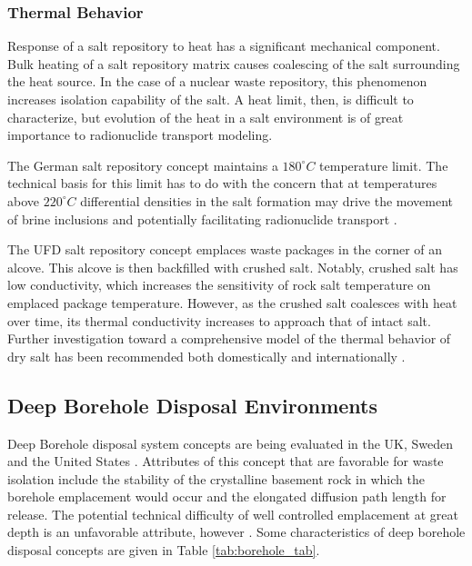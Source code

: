 \subsubsection{Thermal Behavior}
\label{subsec:saltthermal}

Response of a salt repository to heat has a significant
mechanical component. Bulk heating of a salt repository matrix causes
coalescing  of the salt surrounding the heat source. In the case of a nuclear
waste repository, this phenomenon increases isolation capability of the salt. A
heat limit, then, is difficult to characterize, but evolution of the heat in a
salt environment is of great importance to radionuclide transport modeling. 

The German salt repository concept maintains a $180^\circ C$ temperature limit. 
The technical basis for this limit has to do with the concern that at
temperatures above $220^\circ C$ differential densities in the salt formation 
may drive the movement of brine inclusions and potentially facilitating radionuclide transport 
\cite{von_lensa_red-impact_2008, brewitz_long-term_2002, lee_preliminary_2012}. 

The \gls{UFD} salt repository concept emplaces waste packages in the corner of 
an alcove. This alcove is then backfilled with crushed salt. Notably, crushed 
salt has low conductivity, which increases the sensitivity of rock salt 
temperature on emplaced package temperature. However, as the crushed salt 
coalesces with heat over time, its thermal conductivity increases to approach that of 
intact salt. Further investigation toward a comprehensive model of the thermal 
behavior of dry salt has been recommended both domestically and internationally 
\cite{carter_generic_2011}. 


\subsection{Deep Borehole Disposal Environments}

Deep Borehole disposal system concepts are being evaluated in the UK, 
Sweden and the United States \cite{von_lensa_red-impact_2008, 
clayton_generic_2011}. Attributes of this concept that are 
favorable for waste isolation include the stability of the crystalline 
basement rock in which the borehole emplacement would occur and the elongated
diffusion path length for release. The potential technical difficulty of well 
controlled emplacement at great depth is an unfavorable attribute, however 
\cite{hardin_generic_2011}.  Some characteristics of deep borehole disposal 
concepts are given in Table \ref{tab:borehole_tab}.   


